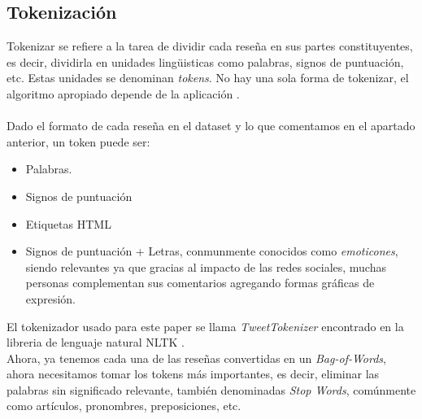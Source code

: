 \documentclass{sciposter}
\begin{document}
\begin{multicols}{3}
\subsection{Tokenizaci\'on}
Tokenizar se refiere a la tarea de dividir cada reseña en sus partes constituyentes, es decir, dividirla en unidades ling\"uisticas como palabras, signos de puntuaci\'on, etc. Estas unidades se denominan \emph{tokens}. No hay una sola forma de tokenizar, el algoritmo apropiado depende de la aplicaci\'on \cite{Potts:2011}.
\\\\
Dado el formato de cada reseña en el dataset y lo que comentamos en el apartado anterior, un token puede ser: 
\begin{itemize}
\item Palabras.
\item Signos de puntuaci\'on
\item Etiquetas HTML
\item Signos de puntuaci\'on + Letras, conmunmente conocidos como \emph{emoticones}, siendo relevantes ya que gracias al impacto de las redes sociales, muchas personas complementan sus comentarios agregando formas gr\'aficas de expresi\'on.
\end{itemize}
El tokenizador usado para este paper se llama \emph{TweetTokenizer} encontrado en la libreria de lenguaje natural NLTK \cite{NLTK:2016}.
\\
Ahora, ya tenemos cada una de las reseñas convertidas en un \emph{Bag-of-Words}, ahora necesitamos tomar los tokens m\'as importantes, es decir, eliminar las palabras sin significado relevante, tambi\'en denominadas \emph{Stop Words}, com\'unmente como art\'iculos, pronombres, preposiciones, etc.
\\\\

\end{multicols}
\end{document}
